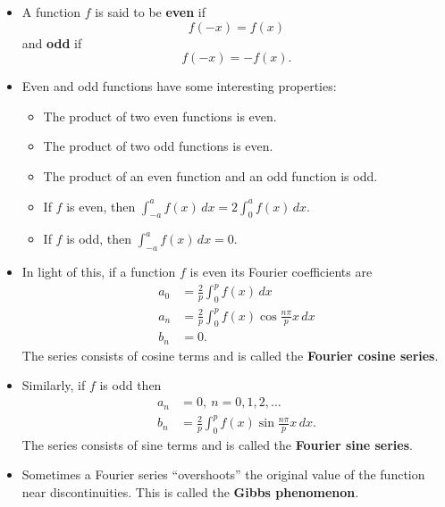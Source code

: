 \documentclass{article}
\begin{document}
\begin{itemize}
  \item A function $f$ is said to be \textbf{even} if \[f(-x) = f(x)\] and \textbf{odd} if \[f(-x) = -f(x).\]

  \item Even and odd functions have some interesting properties:

        \begin{itemize}
          \item The product of two even functions is even.

          \item The product of two odd functions is even.

          \item The product of an even function and an odd function is odd.

          \item If $f$ is even, then $\int_{-a}^a f(x) \,d x = 2 \int_0^a f(x) \,d x$.

          \item If $f$ is odd, then $\int_{-a}^a f(x) \,d x = 0$.
        \end{itemize}

  \item In light of this, if a function $f$ is even its Fourier coefficients are \begin{align*}
          a_0 & = \frac{2}{p} \int_0^p f(x) \,d x                        \\
          a_n & = \frac{2}{p} \int_0^p f(x) \cos \frac{n \pi}{p} x \,d x \\
          b_n & = 0.
        \end{align*} The series consists of cosine terms and is called the \textbf{Fourier cosine series}.

  \item Similarly, if $f$ is odd then \begin{align*}
          a_n & = 0,\ n = 0, 1, 2, \ldots                                 \\
          b_n & = \frac{2}{p} \int_0^p f(x) \sin \frac{n \pi}{p} x \,d x.
        \end{align*} The series consists of sine terms and is called the \textbf{Fourier sine series}.

  \item Sometimes a Fourier series ``overshoots'' the original value of the function near discontinuities. This is called the \textbf{Gibbs phenomenon}.


\end{itemize}
\end{document}
